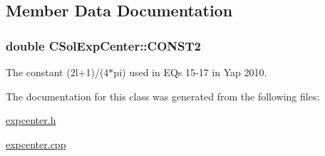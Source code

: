 \subsection{Member Data Documentation}
\hypertarget{classCSolExpCenter_a59aa47d85373866df57f052da0dc0ba1}{
\subsubsection[{C\-O\-N\-S\-T2}]{\setlength{\rightskip}{0pt plus 5cm}double C\-Sol\-Exp\-Center\-::\-C\-O\-N\-S\-T2\hspace{0.3cm}{\ttfamily [static]}}}\label{classCSolExpCenter_a59aa47d85373866df57f052da0dc0ba1}


The constant (2l+1)/(4$\ast$pi) used in E\-Qs 15-\/17 in Yap 2010. 



The documentation for this class was generated from the following files\-:\begin{DoxyCompactItemize}
\item 
\hyperlink{expcenter_8h}{expcenter.\-h}\item 
\hyperlink{expcenter_8cpp}{expcenter.\-cpp}\end{DoxyCompactItemize}
